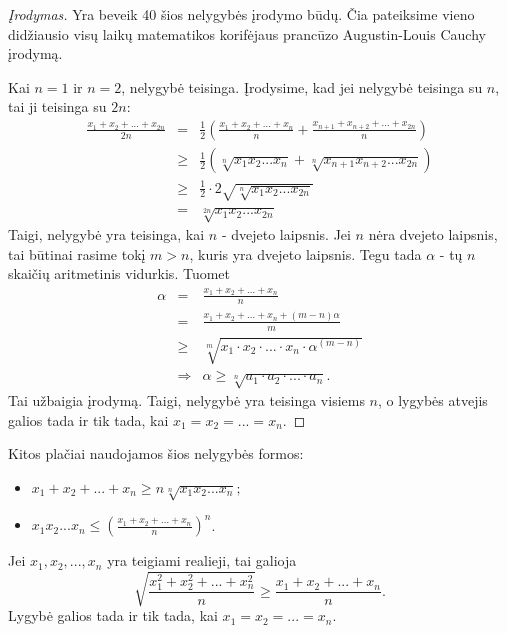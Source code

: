 \begin{proof}[Įrodymas]
  Yra beveik 40 šios nelygybės įrodymo būdų. Čia pateiksime vieno didžiausio
  visų laikų matematikos korifėjaus prancūzo Augustin-Louis Cauchy įrodymą.

  Kai $n=1$ ir $n=2$, nelygybė teisinga. Įrodysime, kad jei nelygybė teisinga
  su $n$, tai ji teisinga su $2n$:
  \begin{eqnarray*}
    \frac{x_{1}+x_{2}+...+x_{2n}}{2n} &=&
    \frac{1}{2}\left(\frac{x_{1}+x_{2}+...+x_{n}}{n} +
    \frac{x_{n+1}+x_{n+2}+...+x_{2n}}{n}\right) \\
    & \geq & \frac{1}{2}\left(\sqrt[n]{x_{1}x_{2}...x_{n}}+\sqrt[n]{x_{n+1}x_{n+2}...x_{2n}}\right) \\
    & \geq & \frac{1}{2}\cdot 2\sqrt{\sqrt[n]{x_{1}x_{2}...x_{2n}}} \\
    & = & \sqrt[2n]{x_{1}x_{2}...x_{2n}}
  \end{eqnarray*}
  Taigi, nelygybė yra teisinga, kai $n$ - dvejeto laipsnis. Jei $n$ nėra
  dvejeto laipsnis, tai būtinai rasime tokį $m>n$, kuris yra dvejeto laipsnis.
  Tegu tada $\alpha$ - tų $n$ skaičių aritmetinis vidurkis. Tuomet
  \begin{eqnarray*}\alpha&=&\frac{x_{1}+x_{2}+...+x_{n}}{n}\\
    &=&\frac{x_{1}+x_{2}+...+x_{n}+(m-n)\alpha}{m}\\&\geq&
    \sqrt[m]{x_{1}\cdot x_{2}\cdot ...\cdot
    x_{n}\cdot\alpha^{(m-n)}}\\&\Rightarrow& \alpha\geq\sqrt[n]{a_1\cdot
    a_2\cdot ... \cdot a_n}.
  \end{eqnarray*}
  Tai užbaigia įrodymą. Taigi,
  nelygybė yra teisinga visiems $n$, o lygybės atvejis galios tada ir tik
  tada, kai $x_{1}=x_{2}=...=x_{n}$.
\end{proof}

\begin{pastaba}
  Kitos plačiai naudojamos šios nelygybės formos:
  \begin{itemize}
    \item $x_{1}+x_{2}+...+x_{n}\geq n\sqrt[n]{x_{1}x_{2}...x_{n}};$
    \item $ x_{1}x_{2}...x_{n}\leq\left(\frac{x_{1}+x_{2}+...+x_{n}}{n}\right)^n$.
  \end{itemize}
\end{pastaba}

\begin{thm}[SM-AM nelygybė]
  Jei $x_{1},x_{2},...,x_{n}$ yra teigiami realieji, tai galioja
  $$\sqrt{\frac{x_{1}^2+x_{2}^2+...+x_{n}^2}{n}}\geq
  \frac{x_{1}+x_{2}+...+x_{n}}{n}.$$ Lygybė galios tada ir tik tada, kai
  $x_{1}=x_{2}=...=x_{n}$.
\end{thm}

